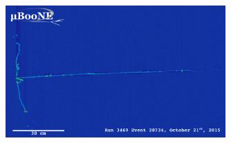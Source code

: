 \begin{figure}[htb]
  \centering
  \includegraphics[width=0.75\textwidth]{lartpc_figures/run3469_subrun574_event28734_col_small.png}
  \caption[\uboone Run 3469, Event 28734]{}
  \label{fig:uboone_r3469_e28734}
\end{figure}

